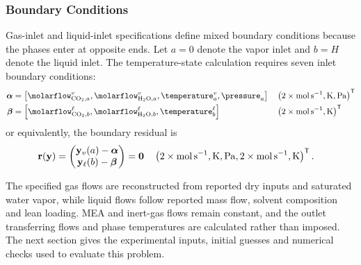 \subsubsection{Boundary Conditions}
Gas-inlet and liquid-inlet specifications define mixed boundary conditions because the phases enter at opposite ends.
Let $a=0$ denote the vapor inlet and $b=H$ denote the liquid inlet.
The temperature-state calculation requires seven inlet boundary conditions:
\begin{align}
\boldsymbol{\alpha} &= \left[\molarflow^{\vap}_{ \COtwo, a}, \molarflow^{\vap}_{ \HtwoO, a}, \temperature^{\vap}_{ a}, \pressure_{a}\right]
&& \left(
2\times\unit{mol\,s^{-1}},
\unit{K},
\unit{Pa}
\right)^{\mathsf{T}}\label{eq:boundary-conditions}\\
\boldsymbol{\beta} &= \left[\molarflow^{\liq}_{ \COtwo, b}, \molarflow^{\liq}_{ \HtwoO, b}, \temperature^{\liq}_{ b}\right]
&& \left(
2\times\unit{mol\,s^{-1}},
\unit{K}
\right)^{\mathsf{T}}
\end{align}
or equivalently, the boundary residual is
\begin{align}
\mathbf{r}(\mathbf{y}) &=
\begin{pmatrix}
\mathbf{y}_{\vap}(a)-\boldsymbol{\alpha}\\
\mathbf{y}_{\liq}(b)-\boldsymbol{\beta}
\end{pmatrix}
=
\mathbf{0}
&& \left(
2\times\unit{mol\,s^{-1}},
\unit{K},
\unit{Pa},
2\times\unit{mol\,s^{-1}},
\unit{K}
\right)^{\mathsf{T}}.\label{eq:boundary-residual}
\end{align}

The specified gas flows are reconstructed from reported dry inputs and saturated water vapor, while liquid flows follow reported mass flow, solvent composition and lean loading.
MEA and inert-gas flows remain constant, and the outlet transferring flows and phase temperatures are calculated rather than imposed.
The next section gives the experimental inputs, initial guesses and numerical checks used to evaluate this problem.
